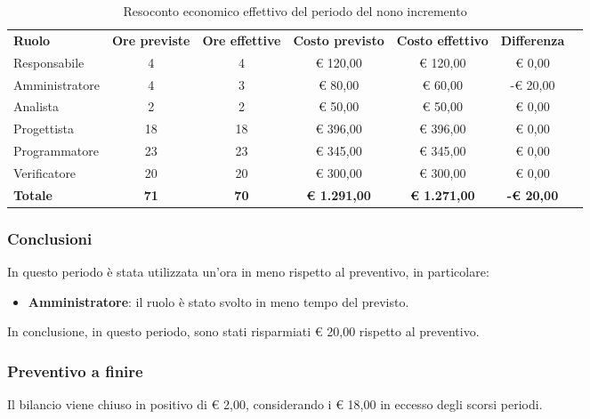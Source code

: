 \documentclass[../piano-di-progetto.tex]{subfiles}
\begin{document}
  \begin{table}[H]
    \centering
    \begin{tabular}{lcccccc}
      \rowcolor{lightgray}
      \textbf{Ruolo}  & \textbf{Ore previste} & \textbf{Ore effettive} & \textbf{Costo previsto} & \textbf{Costo effettivo} & \textbf{Differenza} \\
Responsabile    & 4           & 4           & € 120,00            & € 120,00            & € 0,00            \\
Amministratore  & 4           & 3           & € 80,00             & € 60,00             & -€ 20,00          \\
Analista        & 2           & 2           & € 50,00             & € 50,00             & € 0,00            \\
Progettista     & 18          & 18          & € 396,00            & € 396,00            & € 0,00            \\
Programmatore   & 23          & 23          & € 345,00            & € 345,00            & € 0,00            \\
Verificatore    & 20          & 20          & € 300,00            & € 300,00            & € 0,00            \\
\textbf{Totale} & \textbf{71} & \textbf{70} & \textbf{€ 1.291,00} & \textbf{€ 1.271,00} & \textbf{-€ 20,00}

    \end{tabular}
    \caption{Resoconto economico effettivo del periodo del nono incremento}
  \end{table}

\subsubsection{Conclusioni}
In questo periodo è stata utilizzata un'ora in meno rispetto al preventivo, in particolare:
\begin{itemize}
    \item \textbf{Amministratore}: il ruolo è stato svolto in meno tempo del previsto.
\end{itemize}
In conclusione, in questo periodo, sono stati risparmiati € 20,00 rispetto al preventivo.

\subsubsection{Preventivo a finire}
Il bilancio viene chiuso in positivo di € 2,00, considerando i € 18,00 in eccesso degli scorsi periodi. 
\end{document}
